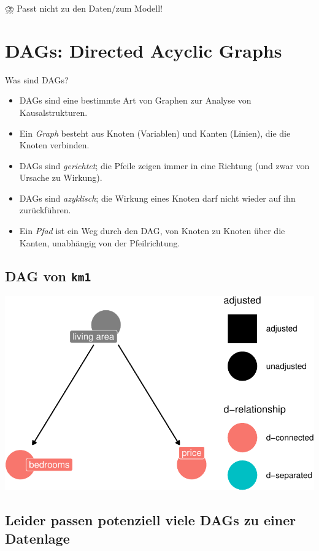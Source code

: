 \documentclass[
  a4paper,
  DIV=11]{scrreprt}
\theoremstyle{definition}
\theoremstyle{remark}
\begin{document}
⛈️ Passt nicht zu den Daten/zum Modell!

\hypertarget{dags-directed-acyclic-graphs}{%
\section{DAGs: Directed Acyclic
Graphs}\label{dags-directed-acyclic-graphs}}

Was sind DAGs?

\begin{itemize}
\item
  DAGs sind eine bestimmte Art von Graphen zur Analyse von
  Kausalstrukturen.
\item
  Ein \emph{Graph} besteht aus Knoten (Variablen) und Kanten (Linien),
  die die Knoten verbinden.
\item
  DAGs sind \emph{gerichtet}; die Pfeile zeigen immer in eine Richtung
  (und zwar von Ursache zu Wirkung).
\item
  DAGs sind \emph{azyklisch}; die Wirkung eines Knoten darf nicht wieder
  auf ihn zurückführen.
\item
  Ein \emph{Pfad} ist ein Weg durch den DAG, von Knoten zu Knoten über
  die Kanten, unabhängig von der Pfeilrichtung.
\end{itemize}

\hypertarget{dag-von-km1}{%
\subsection{\texorpdfstring{DAG von
\texttt{km1}}{DAG von km1}}\label{dag-von-km1}}

\includegraphics{./kausal_files/figure-pdf/unnamed-chunk-9-1.pdf}

\hypertarget{leider-passen-potenziell-viele-dags-zu-einer-datenlage}{%
\subsection{Leider passen potenziell viele DAGs zu einer
Datenlage}\label{leider-passen-potenziell-viele-dags-zu-einer-datenlage}}
\end{document}
